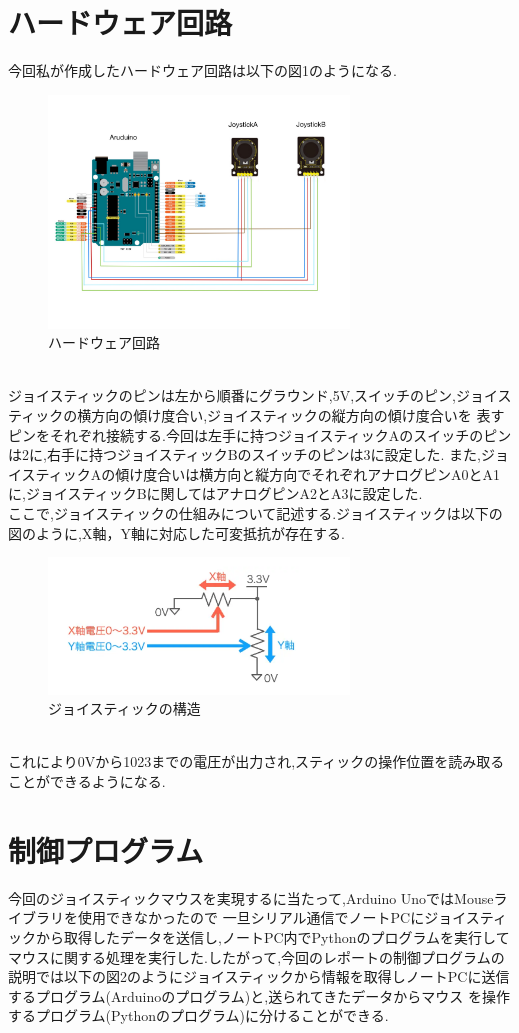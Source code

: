 \documentclass[dvipdfmx]{jarticle}
\begin{document}
\section{ハードウェア回路}
今回私が作成したハードウェア回路は以下の図1のようになる.\cite{1}\cite{6}
\begin{figure}[h]
    \centering
    \includegraphics[width=8cm]{kairo.jpg}
    \caption{ハードウェア回路}
\end{figure}
\\ジョイスティックのピンは左から順番にグラウンド,5V,スイッチのピン,ジョイスティックの横方向の傾け度合い,ジョイスティックの縦方向の傾け度合いを
表すピンをそれぞれ接続する.今回は左手に持つジョイスティックAのスイッチのピンは2に,右手に持つジョイスティックBのスイッチのピンは3に設定した.
また,ジョイスティックAの傾け度合いは横方向と縦方向でそれぞれアナログピンA0とA1に,ジョイスティックBに関してはアナログピンA2とA3に設定した.
\\ここで,ジョイスティックの仕組みについて記述する.ジョイスティックは以下の図のように,X軸，Y軸に対応した可変抵抗が存在する.\cite{7}
\begin{figure}[h]
    \centering
    \includegraphics[width=8cm]{joystick.png}
    \caption{ジョイスティックの構造}
\end{figure}
\\これにより0Vから1023までの電圧が出力され,スティックの操作位置を読み取ることができるようになる.
\section{制御プログラム}
今回のジョイスティックマウスを実現するに当たって,Arduino UnoではMouseライブラリを使用できなかったので
一旦シリアル通信でノートPCにジョイスティックから取得したデータを送信し,ノートPC内でPythonのプログラムを実行して
マウスに関する処理を実行した.\cite{2}したがって,今回のレポートの制御プログラムの説明では以下の図2のようにジョイスティックから情報を取得しノートPCに送信するプログラム(Arduinoのプログラム)と,送られてきたデータからマウス
を操作するプログラム(Pythonのプログラム)に分けることができる.
\end{document}
